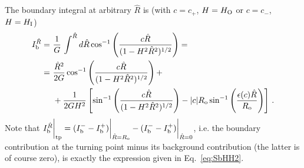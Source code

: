 \documentclass[11pt,a4paper]{article}
\begin{document}
The boundary integral at arbitrary $\hat{R}$ is (with $c = c_{+}$, $H = H_{\rm O}$ or $c = c_{-}$, $H = H_{\rm I}$)
\begin{align}
I_{\rm b}^{\hat{R}} = \,\,& \frac{1}{G} \,\int^{\hat{R}}d\hat{R}\cos^{-1}\left(\frac{c\hat{R}}{(1 - H^{2}\hat{R}^{2})^{1/2}}\right) =\nonumber \\
 = \,\,& \frac{\hat{R}^{2}}{2 G}\cos^{-1}\left(\frac{c\hat{R}}{(1 - H^{2}\hat{R}^{2})^{1/2}}\right)+\nonumber \\
 & + \frac{1}{2 G H^{2}}\left[ {\rm \sin}^{-1}\left(\frac{c \hat{R}}{(1 - H^{2}\hat{R}^{2})^{1/2}}\right) - |c| R_{\rm o}\sin^{-1}\left(\frac{\epsilon(c)\hat{R}}{R_{\rm o}}\right)\right] \,. \label{eq:IhatW}
\end{align}
Note that $I_{\rm b}^{\hat{R}}\bigg|_{\rm tp} = (I_{\rm b}^{-} - I_{\rm b}^{+})\bigg|_{\hat{R} = R_{\rm o}} - (I_{\rm b}^{-} - I_{\rm b}^{+})\bigg|_{\hat{R} = 0}$, i.e. the boundary contribution at the turning point minus its background contribution (the latter is of course zero), is exactly the expression given in Eq.~\eqref{eq:SbHH2}.
\end{document}
